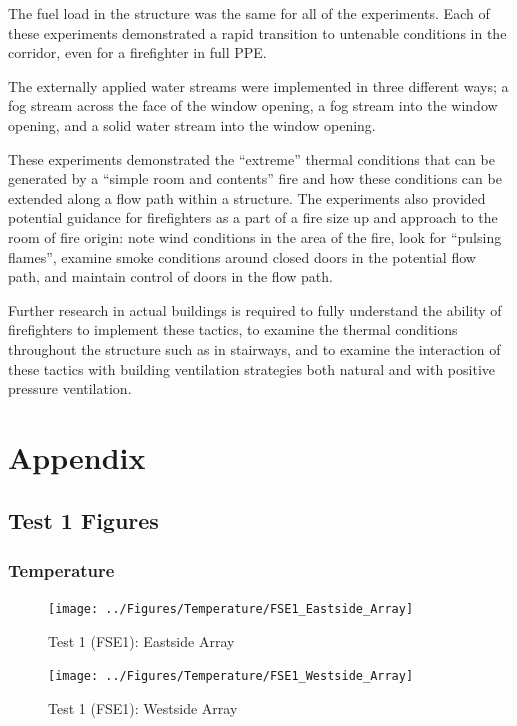 \documentclass[12pt,oneside]{book}
\begin{document}
The fuel load in the structure was the same for all of the experiments. Each of these experiments
demonstrated a rapid transition to untenable conditions in the corridor, even for a firefighter in full PPE.



The externally applied water streams were implemented in three different ways; a fog stream across the face
of the window opening, a fog stream into the window opening, and a solid water stream into the window
opening. 

These experiments demonstrated the “extreme” thermal conditions that can be generated by a “simple
room and contents” fire and how these conditions can be extended along a flow path within a structure.
The experiments also provided potential guidance for firefighters as a part of a fire size up and approach
to the room of fire origin: note wind conditions in the area of the fire, look for “pulsing flames”,
examine smoke conditions around closed doors in the potential flow path, and maintain control of doors
in the flow path.

Further research in actual buildings is required to fully understand the ability of firefighters to
implement these tactics, to examine the thermal conditions throughout the structure such as in stairways,
and to examine the interaction of these tactics with building ventilation strategies both natural and with
positive pressure ventilation.


\chapter{Appendix}
\label{chap:Appendix}

\section{Test 1 Figures}
\label{subsec:Test_1_Figures}

\subsection{Temperature}
\label{subsec:Temperature}

\begin{figure}[!ht]
	\texttt{[image: ../Figures/Temperature/FSE1\_Eastside\_Array]}
	\caption{Test 1 (FSE1): Eastside Array}
	\label{fig:Test_1_Eastside_Array}
\end{figure}

\begin{figure}[!ht]
	\texttt{[image: ../Figures/Temperature/FSE1\_Westside\_Array]}
	\caption{Test 1 (FSE1): Westside Array}
	\label{fig:Test_1_Westside_Array}
\end{figure}
\end{document}
